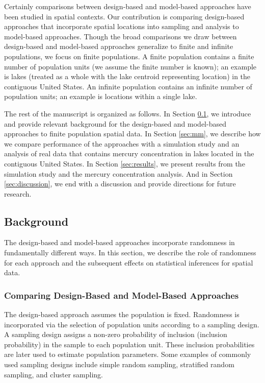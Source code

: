\documentclass[]{elsarticle} %
\begin{document}
Certainly comparisons between design-based and model-based approaches
have been studied in spatial contexts. Our contribution is comparing
design-based approaches that incorporate spatial locations into sampling
and analysis to model-based approaches. Though the broad comparisons we
draw between design-based and model-based approaches generalize to
finite and infinite populations, we focus on finite populations. A
finite population contains a finite number of population units (we
assume the finite number is known); an example is lakes (treated as a
whole with the lake centroid representing location) in the contiguous
United States. An infinite population contains an infinite number of
population units; an example is locations within a single lake.

The rest of the manuscript is organized as follows. In Section
\ref{sec:background}, we introduce and provide relevant background for
the design-based and model-based approaches to finite population spatial
data. In Section \ref{sec:mm}, we describe how we compare performance of
the approaches with a simulation study and an analysis of real data that
contains mercury concentration in lakes located in the contiguous United
States. In Section \ref{sec:results}, we present results from the
simulation study and the mercury concentration analysis. And in Section
\ref{sec:discussion}, we end with a discussion and provide directions
for future research.

\hypertarget{sec:background}{%
\subsection{Background}\label{sec:background}}

The design-based and model-based approaches incorporate randomness in
fundamentally different ways. In this section, we describe the role of
randomness for each approach and the subsequent effects on statistical
inferences for spatial data.

\hypertarget{subsec:dvm_compare}{%
\subsubsection{Comparing Design-Based and Model-Based
Approaches}\label{subsec:dvm_compare}}

The design-based approach assumes the population is fixed. Randomness is
incorporated via the selection of population units according to a
sampling design. A sampling design assigns a non-zero probability of
inclusion (inclusion probability) in the sample to each population unit.
These inclusion probabilities are later used to estimate population
parameters. Some examples of commonly used sampling designs include
simple random sampling, stratified random sampling, and cluster
sampling.
\end{document}

